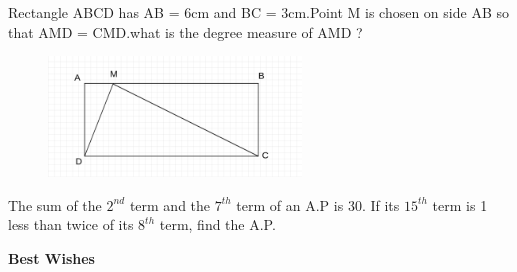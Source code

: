 \documentclass[11pt, a4paper]{exam}
\begin{document}
\begin{questions}
	\pointsdroppedatright
	\question
  
Rectangle ABCD has AB = 6cm and BC = 3cm.Point M is chosen on side AB so that
\angle AMD = \angle CMD.what is the degree measure of \angle AMD ?
 	\begin{figure}[h!]
	\centering
	\includegraphics[width=0.6\textwidth]{figs/1.png}
	\end{figure}



	\question
The sum of the $2^{nd}$ term and the $7^{th}$ term of an A.P is 30. If its $15^{th}$ term is 1 less than
twice of its $8^{th}$ term, find the A.P.

\end{questions}
\vspace{0.1in}
{\large \bfseries Best Wishes}
\end{document}
